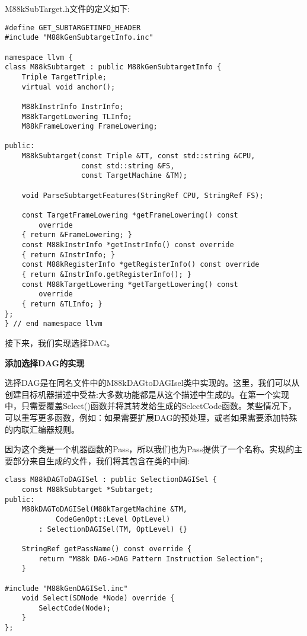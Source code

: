 M88kSubTarget.h文件的定义如下:\par

\begin{lstlisting}[caption={}]
#define GET_SUBTARGETINFO_HEADER
#include "M88kGenSubtargetInfo.inc"

namespace llvm {
class M88kSubtarget : public M88kGenSubtargetInfo {
	Triple TargetTriple;
	virtual void anchor();
	
	M88kInstrInfo InstrInfo;
	M88kTargetLowering TLInfo;
	M88kFrameLowering FrameLowering;
	
public:
	M88kSubtarget(const Triple &TT, const std::string &CPU,
				  const std::string &FS,
				  const TargetMachine &TM);
				  
	void ParseSubtargetFeatures(StringRef CPU, StringRef FS);
	
	const TargetFrameLowering *getFrameLowering() const
		override
	{ return &FrameLowering; }
	const M88kInstrInfo *getInstrInfo() const override
	{ return &InstrInfo; }
	const M88kRegisterInfo *getRegisterInfo() const override
	{ return &InstrInfo.getRegisterInfo(); }
	const M88kTargetLowering *getTargetLowering() const
		override
	{ return &TLInfo; }
};
} // end namespace llvm
\end{lstlisting}

接下来，我们实现选择DAG。\par

\hspace*{\fill} \par %
\textbf{添加选择DAG的实现}

选择DAG是在同名文件中的M88kDAGtoDAGIsel类中实现的。这里，我们可以从创建目标机器描述中受益:大多数功能都是从这个描述中生成的。在第一个实现中，只需要覆盖Select()函数并将其转发给生成的SelectCode函数。某些情况下，可以重写更多函数，例如：如果需要扩展DAG的预处理，或者如果需要添加特殊的内联汇编器规则。\par

因为这个类是一个机器函数的Pass，所以我们也为Pass提供了一个名称。实现的主要部分来自生成的文件，我们将其包含在类的中间:\par

\begin{lstlisting}[caption={}]
class M88kDAGToDAGISel : public SelectionDAGISel {
	const M88kSubtarget *Subtarget;
public:
	M88kDAGToDAGISel(M88kTargetMachine &TM,
			CodeGenOpt::Level OptLevel)
		: SelectionDAGISel(TM, OptLevel) {}
		
	StringRef getPassName() const override {
		return "M88k DAG->DAG Pattern Instruction Selection";
	}

#include "M88kGenDAGISel.inc"
	void Select(SDNode *Node) override {
		SelectCode(Node);
	}
};
\end{lstlisting}

